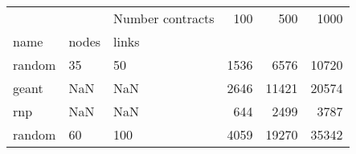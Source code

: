 \begin{tabular}{lllrrr}
\toprule
 &  & Number contracts & 100 & 500 & 1000 \\
name & nodes & links &  &  &  \\
\midrule
random & 35 & 50 & 1536 & 6576 & 10720 \\
\cline{1-6} \cline{2-6}
geant & NaN & NaN & 2646 & 11421 & 20574 \\
\cline{1-6} \cline{2-6}
rnp & NaN & NaN & 644 & 2499 & 3787 \\
\cline{1-6} \cline{2-6}
random & 60 & 100 & 4059 & 19270 & 35342 \\
\cline{1-6} \cline{2-6}
\bottomrule
\end{tabular}
